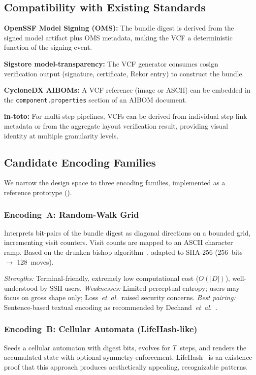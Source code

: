 \documentclass[conference,10pt]{IEEEtran}
\newcommand{\etal}{\textit{et~al.}}
\begin{document}
\subsection{Compatibility with Existing Standards}

\noindent\textbf{OpenSSF Model Signing (OMS):} The bundle digest is derived from the signed model artifact plus OMS metadata, making the VCF a deterministic function of the signing event.

\noindent\textbf{Sigstore model-transparency:} The VCF generator consumes cosign verification output (signature, certificate, Rekor entry) to construct the bundle.

\noindent\textbf{CycloneDX AIBOMs:} A VCF reference (image or ASCII) can be embedded in the \texttt{component.properties} section of an AIBOM document.

\noindent\textbf{in-toto:} For multi-step pipelines, VCFs can be derived from individual step link metadata or from the aggregate layout verification result, providing visual identity at multiple granularity levels.

\subsection{Candidate Encoding Families}

We narrow the design space to three encoding families, implemented as a reference prototype ().

\subsubsection{Encoding~A: Random-Walk Grid}
Interprets bit-pairs of the bundle digest as diagonal directions on a bounded grid, incrementing visit counters.
Visit counts are mapped to an ASCII character ramp.
Based on the drunken bishop algorithm~\cite{loss2009drunken}, adapted to SHA-256 (256~bits $\rightarrow$ 128~moves).

\smallskip\noindent\textit{Strengths:} Terminal-friendly, extremely low computational cost ($O(|D|)$), well-understood by SSH users.
\textit{Weaknesses:} Limited perceptual entropy; users may focus on gross shape only; Loss~\etal\ raised security concerns.
\textit{Best pairing:} Sentence-based textual encoding as recommended by Dechand~\etal~\cite{dechand2016empirical}.

\subsubsection{Encoding~B: Cellular Automata (LifeHash-like)}
Seeds a cellular automaton with digest bits, evolves for $T$~steps, and renders the accumulated state with optional symmetry enforcement.
LifeHash~\cite{lifehash2021} is an existence proof that this approach produces aesthetically appealing, recognizable patterns.
\end{document}

